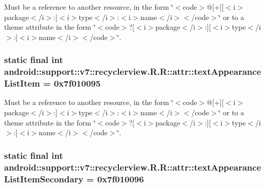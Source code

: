 Must be a reference to another resource, in the form \char`\"{}$<$code$>$@\mbox{[}+\mbox{]}\mbox{[}$<$i$>$package$<$/i$>$:\mbox{]}$<$i$>$type$<$/i$>$:$<$i$>$name$<$/i$>$$<$/code$>$\char`\"{} or to a theme attribute in the form \char`\"{}$<$code$>$?\mbox{[}$<$i$>$package$<$/i$>$:\mbox{]}\mbox{[}$<$i$>$type$<$/i$>$:\mbox{]}$<$i$>$name$<$/i$>$$<$/code$>$\char`\"{}. \hypertarget{classandroid_1_1support_1_1v7_1_1recyclerview_1_1_r_1_1attr_249a3e76ea8f56bee15a90178f410853}{
\subsubsection[{textAppearanceListItem}]{\setlength{\rightskip}{0pt plus 5cm}static final int android::support::v7::recyclerview.R.R::attr::textAppearanceListItem = 0x7f010095}}
\label{classandroid_1_1support_1_1v7_1_1recyclerview_1_1_r_1_1attr_249a3e76ea8f56bee15a90178f410853}


Must be a reference to another resource, in the form \char`\"{}$<$code$>$@\mbox{[}+\mbox{]}\mbox{[}$<$i$>$package$<$/i$>$:\mbox{]}$<$i$>$type$<$/i$>$:$<$i$>$name$<$/i$>$$<$/code$>$\char`\"{} or to a theme attribute in the form \char`\"{}$<$code$>$?\mbox{[}$<$i$>$package$<$/i$>$:\mbox{]}\mbox{[}$<$i$>$type$<$/i$>$:\mbox{]}$<$i$>$name$<$/i$>$$<$/code$>$\char`\"{}. \hypertarget{classandroid_1_1support_1_1v7_1_1recyclerview_1_1_r_1_1attr_022f2126db5e864efedb4ec005eb7657}{
\subsubsection[{textAppearanceListItemSecondary}]{\setlength{\rightskip}{0pt plus 5cm}static final int android::support::v7::recyclerview.R.R::attr::textAppearanceListItemSecondary = 0x7f010096}}
\label{classandroid_1_1support_1_1v7_1_1recyclerview_1_1_r_1_1attr_022f2126db5e864efedb4ec005eb7657}


